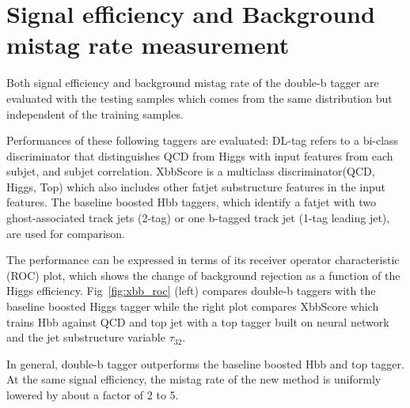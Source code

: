 \section{Signal efficiency and Background mistag rate measurement}
\label{sec:per}

\par Both signal efficiency and background mistag rate of the double-b tagger are evaluated with the testing samples which comes from the same distribution but independent of the training samples.


\par Performances of these following taggers are evaluated: DL-tag refers to a bi-class discriminator that distinguishes QCD from Higgs with input features from each subjet, and subjet correlation. 
XbbScore is a multiclass discriminator(QCD, Higgs, Top) which also includes other fatjet substructure features in the input features. 
The baseline boosted Hbb taggers, which identify a fatjet with two ghost-associated track jets (2-tag) or one b-tagged track jet (1-tag leading jet), are used for comparison.


\par The performance can be expressed in terms of its receiver operator characteristic (ROC) plot, which shows the change of background rejection as a function of the Higgs efficiency. Fig~\ref{fig:xbb_roc} (left) compares double-b taggers with the baseline boosted Higgs tagger while the right plot compares XbbScore which trains Hbb against QCD and top jet with a top tagger built on neural network and the jet substructure variable $\tau_{32}$.
\par In general, double-b tagger outperforms the baseline boosted Hbb and top tagger. At the same signal efficiency, the mistag rate of the new method is uniformly lowered by about a factor of 2 to 5.

